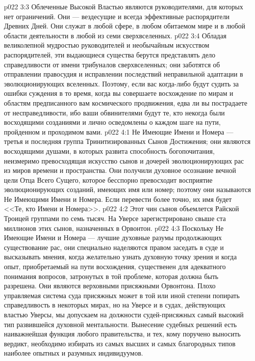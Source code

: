 \vs p022 3:3 Облеченные Высокой Властью являются руководителями, для которых нет ограничений. Они --- вездесущие и всегда эффективные распорядители Древних Дней. Они служат в любой сфере, в любом обитаемом мире и в любой области деятельности в любой из семи сверхвселенных.
\vs p022 3:4 Обладая великолепной мудростью руководителей и необычайным искусством распорядителей, эти выдающиеся существа берутся представлять дело справедливости от имени трибуналов сверхвселенных; они заботятся об отправлении правосудия и исправлении последствий неправильной адаптации в эволюционирующих вселенных. Поэтому, если вас когда\hyp{}либо будут судить за ошибки суждения в то время, когда вы совершаете восхождение по мирам и областям предписанного вам космического продвижения, едва ли вы пострадаете от несправедливости, ибо ваши обвинителями будут те, кто некогда были восходящими созданиями и лично осведомлены о каждом шаге на пути, пройденном и проходимом вами.
\vs p022 4:1 Не Имеющие Имени и Номера --- третья и последняя группа Тринитизированных Сынов Достижения; они являются восходящими душами, в которых развита способность богопочитания, неизмеримо превосходящая искусство сынов и дочерей эволюционирующих рас из миров времени и пространства. Они получили духовное осознание вечной цели Отца Всего Сущего, которое бесспорно превосходит восприятие эволюционирующих созданий, имеющих имя или номер; поэтому они называются Не Имеющими Имени и Номера. Если перевести более точно, их имя будет <<Те, кто  Имени и Номера>>.
\vs p022 4:2 Этот чин сынов объемлется Райской Троицей группами по семь тысяч. На Уверсе зарегистрировано свыше ста миллионов этих сынов, назначенных в Орвонтон.
\vs p022 4:3 Поскольку Не Имеющие Имени и Номера --- лучшие духовные разумы продолжающих существование рас, они специально наделяются правом заседать в суде и высказывать мнения, когда желательно узнать духовную точку зрения и когда опыт, приобретаемый на пути восхождения, существенен для адекватного понимания вопросов, затронутых в той проблеме, которая должна быть разрешена. Они являются верховными присяжными Орвонтона. Плохо управляемая система суда присяжных может в той или иной степени попирать справедливость в некоторых мирах, но на Уверсе и в судах, действующих властью Уверсы, мы допускаем на должности судей\hyp{}присяжных самый высокий тип развившейся духовной ментальности. Вынесение судебных решений есть наиважнейшая функция любого правительства, и тех, кому поручено выносить вердикт, необходимо избирать из самых высших и самых благородных типов наиболее опытных и разумных индивидуумов.
